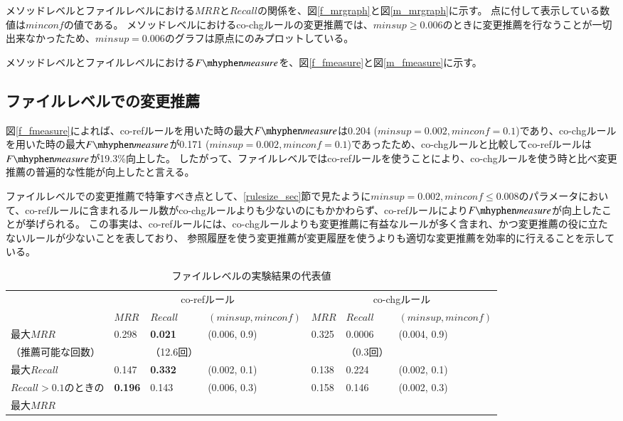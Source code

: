 \documentclass[a4paper]{jsbook}
\newcommand{\minconf}{mincon\!f}
\newcommand{\fmeasure}{F\mhyphen measure}
\begin{document}
メソッドレベルとファイルレベルにおける$MRR$と$Recall$の関係を、図\ref{f_mrgraph}と図\ref{m_mrgraph}に示す。
点に付して表示している数値は$\minconf$の値である。
メソッドレベルにおけるco-chgルールの変更推薦では、$minsup \geq 0.006$のときに変更推薦を行なうことが一切出来なかったため、$minsup = 0.006$のグラフは原点にのみプロットしている。

メソッドレベルとファイルレベルにおける$\fmeasure$を、図\ref{f_fmeasure}と図\ref{m_fmeasure}に示す。

\subsection{ファイルレベルでの変更推薦}
図\ref{f_fmeasure}によれば、co-refルールを用いた時の最大$\fmeasure$は0.204 ($minsup=0.002, \minconf =0.1$)であり、co-chgルールを用いた時の最大$\fmeasure$が0.171 ($minsup=0.002, \minconf =0.1$)であったため、co-chgルールと比較してco-refルールは$\fmeasure$が19.3\%向上した。
したがって、ファイルレベルではco-refルールを使うことにより、co-chgルールを使う時と比べ変更推薦の普遍的な性能が向上したと言える。

ファイルレベルでの変更推薦で特筆すべき点として、\ref{rulesize_sec}節で見たように$minsup=0.002,\minconf \leq 0.008$のパラメータにおいて、co-refルールに含まれるルール数がco-chgルールよりも少ないのにもかかわらず、co-refルールにより$\fmeasure$が向上したことが挙げられる。
この事実は、co-refルールには、co-chgルールよりも変更推薦に有益なルールが多く含まれ、かつ変更推薦の役に立たないルールが少ないことを表しており、
参照履歴を使う変更推薦が変更履歴を使うよりも適切な変更推薦を効率的に行えることを示している。

\begin{table}[t]
  \begin{center}
    \caption{ファイルレベルの実験結果の代表値}
    \label{results_file_table}
    \begin{tabular}{l|lll|lll}
      \hline
       & \multicolumn{3}{|c|}{co-refルール} & \multicolumn{3}{|c}{co-chgルール}\\
       &$MRR$ & $Recall$ & $(minsup,\minconf)$ & $MRR$ & $Recall$ & $(minsup,\minconf)$ \\
      \hline
      最大$MRR$ &0.298&{\bf 0.021} & (0.006, 0.9) &0.325&0.0006 & (0.004, 0.9)\\
      （推薦可能な回数）            &&（12.6回） &&& （0.3回）\\
      \hline
      最大$Recall$    &0.147&{\bf 0.332} & (0.002, 0.1) &0.138&0.224 & (0.002, 0.1) \\
      \hline
      $Recall > 0.1$のときの &{\bf 0.196}& 0.143 & (0.006, 0.3) &0.158&0.146 & (0.002, 0.3) \\
      最大$MRR$&&&&&\\
      \hline
    \end{tabular}
  \end{center}
\end{table}
\end{document}
